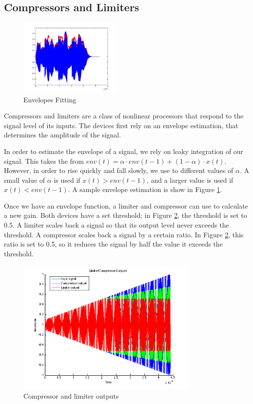 \documentclass[letterpaper,12pt]{article}
\begin{document}
\subsection{Compressors and Limiters}

\begin{figure}
\centering
\includegraphics[width=0.45\textwidth]{figures/envelope-fit.png}
\caption{Envelopes Fitting}
\label{fig:envelopes}
\end{figure}

Compressors and limiters are a class of nonlinear processors that respond to the signal level of its inputs. The devices first rely on an envelope estimation, that determines the amplitude of the signal.

In order to estimate the envelope of a signal, we rely on leaky integration of our signal. This takes the from $env(t) = \alpha \cdot env(t-1) + (1-\alpha) \cdot x(t)$. However, in order to rise quickly and fall slowly, we use to different values of $\alpha$. A small value of $\alpha$ is used if $x(t) > env(t-1)$, and a larger value is used if $x(t) < env(t-1)$. A sample envelope estimation is show in Figure \ref{fig:envelopes}.

Once we have an envelope function, a limiter and compressor can use to calculate a new gain. Both devices have a set threshold; in Figure \ref{fig:compressor-limiter}, the threshold is set to 0.5. A limiter scales back a signal so that its output level never exceeds the threshold. A compressor scales back a signal by a certain ratio. In Figure \ref{fig:compressor-limiter}, this ratio is set to 0.5, so it reduces the signal by half the value it exceeds the threshold.

\begin{figure}[h]
\centering
\includegraphics[width=0.8\textwidth]{figures/limiter-compressor-output.png}
\caption{Compressor and limiter outputs}
\label{fig:compressor-limiter}
\end{figure}
\end{document}
